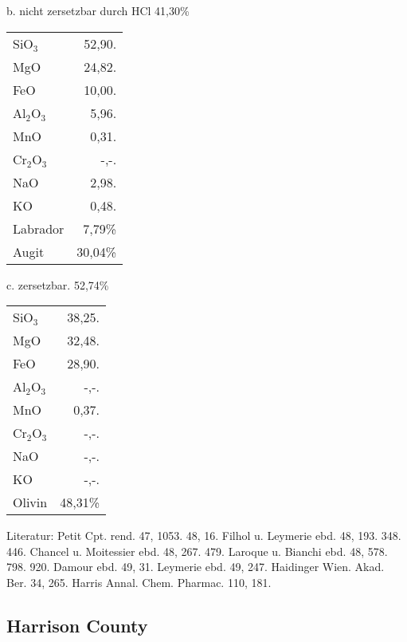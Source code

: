 \documentclass[a4paper, 11pt, oneside]{article}
\begin{document}
\begin{center}
b. nicht zersetzbar durch HCl 41,30\%
\end{center}

\begin{table}[H]
    \centering
    \begin{tabular}{l r}
        SiO$_{3}$ & 52,90. \\
        MgO & 24,82. \\
        FeO & 10,00. \\
        Al$_{2}$O$_{3}$ & 5,96. \\
        MnO & 0,31. \\
        Cr$_{2}$O$_{3}$ & -,-. \\
        NaO & 2,98. \\
        KO & 0,48. \\ \hline
        Labrador & 7,79\% \\
        Augit & 30,04\% \\
    \end{tabular}
\end{table}

\begin{center}
c. zersetzbar. 52,74\%
\end{center}

\begin{table}[H]
    \centering
    \begin{tabular}{l r}
        SiO$_{3}$ & 38,25. \\
        MgO & 32,48. \\
        FeO & 28,90. \\
        Al$_{2}$O$_{3}$ & -,-. \\
        MnO & 0,37. \\
        Cr$_{2}$O$_{3}$ & -,-. \\
        NaO & -,-. \\
        KO & -,-. \\ \hline
        Olivin & 48,31\% \\
    \end{tabular}
\end{table}

\footnotesize
Literatur: Petit Cpt. rend. 47, 1053. 48, 16. Filhol u. Leymerie ebd. 48, 193. 348. 446. Chancel u. Moitessier ebd. 48, 267. 479. Laroque u. Bianchi ebd. 48, 578. 798. 920. Damour ebd. 49, 31. Leymerie ebd. 49, 247. Haidinger Wien. Akad. Ber. 34, 265. Harris Annal. Chem. Pharmac. 110, 181.

\subsection{Harrison County}
\normalsize
\end{document}
